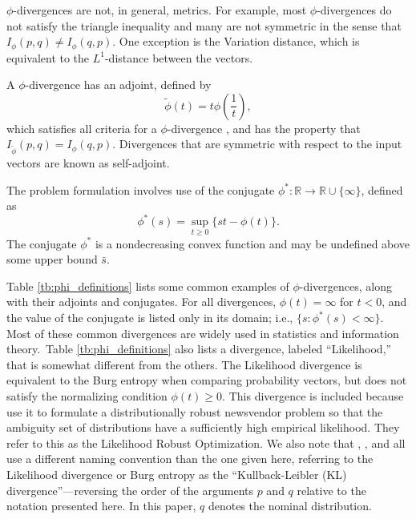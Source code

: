 \documentclass[opre,nonblindrev]{informs3} %
\newcommand{\R}{{\mathbb{R}}}
\begin{document}
$\phi$-divergences are not, in general, metrics.
For example, most $\phi$-divergences do not satisfy the triangle inequality and many are not symmetric in the sense that $I_\phi(p,q) \neq I_\phi(q,p)$.
One exception is the Variation distance, which is equivalent to the $L^1$-distance between the vectors.

A $\phi$-divergence has an adjoint, defined by
\begin{equation} \label{eq:adjoint}
	\tilde{\phi}(t) = t \phi\left(\frac{1}{t}\right),
\end{equation}
which satisfies all criteria for a $\phi$-divergence \citep{bental1991certainty}, and has the property that $I_{\tilde{\phi}}(p,q) = I_\phi(q,p)$.
Divergences that are symmetric with respect to the input vectors are known as self-adjoint.

The problem formulation involves use of the conjugate $\phi^* : \R \rightarrow \R \cup \{\infty\}$, defined as
\begin{equation} \label{eq:conjugate}
	\phi^*(s) = \sup_{t \geq 0} \{st - \phi(t)\}.
\end{equation}
The conjugate $\phi^*$ is a nondecreasing convex function and may be undefined above some upper bound $\bar{s}$.

Table \ref{tb:phi_definitions} lists some common examples of $\phi$-divergences, along with their adjoints and conjugates.
For all divergences, $\phi(t) = \infty$ for $t < 0$, and the value of the conjugate is listed only in its domain; i.e., $\{s : \phi^*(s) < \infty\}$.
Most of these common divergences are widely used in statistics and information theory.\
Table \ref{tb:phi_definitions} also lists a divergence, labeled ``Likelihood,'' that is somewhat different from the others.
The Likelihood divergence is equivalent to the Burg entropy when comparing probability vectors, but does not satisfy the normalizing condition $\phi(t) \geq 0$.
This divergence is included because \cite{wang2010likelihood} use it to formulate a distributionally robust newsvendor problem so that the ambiguity set of distributions have a sufficiently high empirical likelihood. 
They refer to this as the Likelihood Robust Optimization.
We also note that \cite{calafiore2007ambiguous}, \cite{hukullback}, and \cite{wang2010likelihood} all use a different naming convention than the one given here, referring to the Likelihood divergence or Burg entropy as the ``Kullback-Leibler (KL) divergence''---reversing the order of the arguments $p$ and $q$ relative to the notation presented here.
In this paper, $q$ denotes the nominal distribution.
\end{document}

